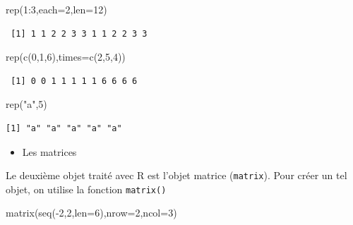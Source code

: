\documentclass[
  8pt,
  ignorenonframetext,
]{beamer}
\newenvironment{Shaded}{\begin{snugshade}}{\end{snugshade}}
\newcommand{\AttributeTok}[1]{\textcolor[rgb]{0.77,0.63,0.00}{#1}}
\newcommand{\DecValTok}[1]{\textcolor[rgb]{0.00,0.00,0.81}{#1}}
\newcommand{\FunctionTok}[1]{\textcolor[rgb]{0.00,0.00,0.00}{#1}}
\newcommand{\NormalTok}[1]{#1}
\newcommand{\SpecialCharTok}[1]{\textcolor[rgb]{0.00,0.00,0.00}{#1}}
\newcommand{\StringTok}[1]{\textcolor[rgb]{0.31,0.60,0.02}{#1}}
\providecommand{\tightlist}{%
  \setlength{\itemsep}{0pt}\setlength{\parskip}{0pt}}
\begin{document}
\begin{frame}[fragile]{}
\protect\hypertarget{section-1}{}
\begin{Shaded}
\begin{Highlighting}[]
\FunctionTok{rep}\NormalTok{(}\DecValTok{1}\SpecialCharTok{:}\DecValTok{3}\NormalTok{,}\AttributeTok{each=}\DecValTok{2}\NormalTok{,}\AttributeTok{len=}\DecValTok{12}\NormalTok{)}
\end{Highlighting}
\end{Shaded}

\begin{verbatim}
 [1] 1 1 2 2 3 3 1 1 2 2 3 3
\end{verbatim}

\begin{Shaded}
\begin{Highlighting}[]
\FunctionTok{rep}\NormalTok{(}\FunctionTok{c}\NormalTok{(}\DecValTok{0}\NormalTok{,}\DecValTok{1}\NormalTok{,}\DecValTok{6}\NormalTok{),}\AttributeTok{times=}\FunctionTok{c}\NormalTok{(}\DecValTok{2}\NormalTok{,}\DecValTok{5}\NormalTok{,}\DecValTok{4}\NormalTok{))}
\end{Highlighting}
\end{Shaded}

\begin{verbatim}
 [1] 0 0 1 1 1 1 1 6 6 6 6
\end{verbatim}

\begin{Shaded}
\begin{Highlighting}[]
\FunctionTok{rep}\NormalTok{(}\StringTok{"a"}\NormalTok{,}\DecValTok{5}\NormalTok{)}
\end{Highlighting}
\end{Shaded}

\begin{verbatim}
[1] "a" "a" "a" "a" "a"
\end{verbatim}

\pause

\begin{itemize}
\tightlist
\item
  Les matrices
\end{itemize}

Le deuxième objet traité avec R est l'objet matrice (\texttt{matrix}).
Pour créer un tel objet, on utilise la fonction \texttt{matrix()}

\begin{Shaded}
\begin{Highlighting}[]
\FunctionTok{matrix}\NormalTok{(}\FunctionTok{seq}\NormalTok{(}\SpecialCharTok{{-}}\DecValTok{2}\NormalTok{,}\DecValTok{2}\NormalTok{,}\AttributeTok{len=}\DecValTok{6}\NormalTok{),}\AttributeTok{nrow=}\DecValTok{2}\NormalTok{,}\AttributeTok{ncol=}\DecValTok{3}\NormalTok{)}
\end{Highlighting}
\end{Shaded}


\end{frame}
\end{document}
